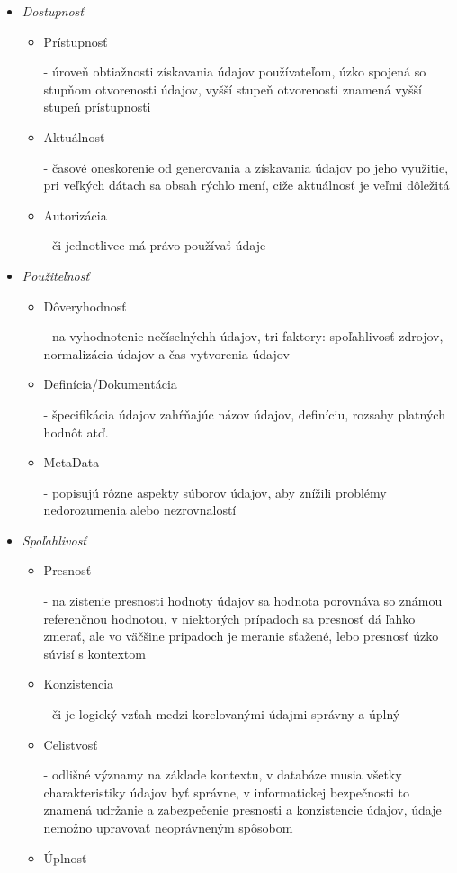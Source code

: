\documentclass[10pt,slovak,a4paper]{article}
\begin{document}
\begin{itemize}
\item \emph {Dostupnosť}
	\begin{itemize}
	\item Prístupnosť

	 - úroveň obtiažnosti získavania údajov používateľom, úzko spojená so stupňom otvorenosti údajov, vyšší stupeň otvorenosti znamená vyšší stupeň prístupnosti
	\item Aktuálnosť

	 - časové oneskorenie od generovania a získavania údajov po jeho využitie, pri veľkých dátach sa obsah rýchlo mení, ciže aktuálnosť je veľmi dôležitá
	\item Autorizácia

	 - či jednotlivec má právo používať údaje
	\end{itemize}
\item \emph {Použiteľnosť}
	\begin{itemize}
	\item Dôveryhodnosť

	 - na vyhodnotenie nečíselnýchh údajov, tri faktory: spoľahlivosť zdrojov, normalizácia údajov a čas vytvorenia údajov
	\item Definícia/Dokumentácia

	- špecifikácia údajov zahŕňajúc názov údajov, definíciu, rozsahy platných hodnôt atď.
	\item MetaData

	- popisujú rôzne aspekty súborov údajov, aby znížili problémy nedorozumenia alebo nezrovnalostí
	\end{itemize}
\item \emph {Spoľahlivosť}
	\begin{itemize}
	\item Presnosť

	- na zistenie presnosti hodnoty údajov sa hodnota porovnáva so známou referenčnou hodnotou, v niektorých prípadoch sa presnosť dá ľahko zmerať, ale vo väčšine pripadoch je meranie sťažené, lebo 		presnosť úzko súvisí s kontextom
	\item Konzistencia

	- či je logický vzťah medzi korelovanými údajmi správny a úplný
	\item Celistvosť

	- odlišné významy na základe kontextu, v databáze musia všetky charakteristiky údajov byť správne, v informatickej bezpečnosti to znamená udržanie a zabezpečenie presnosti a konzistencie údajov, údaje 	nemožno upravovať neoprávneným spôsobom
	\item Úplnosť


\end{itemize}
\end{itemize}
\end{document}
